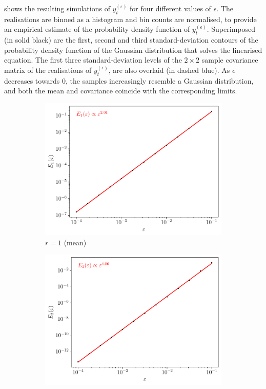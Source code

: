  shows the resulting simulations of \(y_t^{(\epsilon)}\) for four different values of \(\epsilon\).
The realisations are binned as a histogram and bin counts are normalised, to provide an empirical estimate of the probability density function of \(y_t^{(\epsilon)}\).
Superimposed (in solid black) are the first, second and third standard-deviation contours of the probability density function of the Gaussian distribution that solves the linearised equation.
The first three standard-deviation levels of the \(2\times 2\) sample covariance matrix of the realisations of \(y_t^{(\epsilon)}\), are also overlaid (in dashed blue).
As \(\epsilon\) decreases towards \(0\), the samples increasingly resemble a Gaussian distribution, and both the mean and covariance coincide with the corresponding limits.

\begin{figure}
	\begin{center}
		\begin{subfigure}{0.49\textwidth}
			\includegraphics[width=\textwidth]{chp04_paper_numerics/figures/rossby/str_err_r_1.0.pdf}
			\caption{\(r = 1\) (mean)}
			\label{fig:gamma_z_valid_1}
		\end{subfigure}
		\begin{subfigure}{0.49\textwidth}
			\includegraphics[width=\textwidth]{chp04_paper_numerics/figures/rossby/str_err_r_2.0.pdf}

\end{subfigure}
\end{center}
\end{figure}
